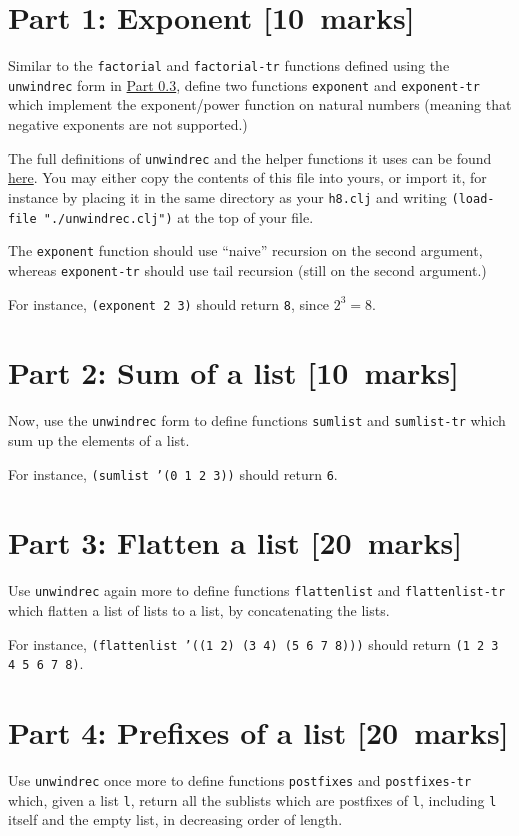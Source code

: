 \documentclass[11pt]{article}
\begin{document}
\section*{Part 1: Exponent              [10 marks]}
\label{sec:org66a7fe8}
Similar to the \texttt{factorial} and \texttt{factorial-tr} functions defined
using the \texttt{unwindrec} form in \hyperref[sec:org930ca81]{Part 0.3},
define two functions \texttt{exponent} and \texttt{exponent-tr} which
implement the exponent/power function on natural numbers
(meaning that negative exponents are not supported.)

The full definitions of \texttt{unwindrec} and the helper functions it uses
can be found \href{./src/h8/unwindrec.clj}{here}. You may either copy the contents of this file into yours,
or import it, for instance by placing it in the same directory
as your \texttt{h8.clj} and writing \texttt{(load-file "./unwindrec.clj")} at the top of your file.

The \texttt{exponent} function should use “naive” recursion on the second argument,
whereas \texttt{exponent-tr} should use tail recursion (still on the second argument.)

For instance, \texttt{(exponent 2 3)} should return \texttt{8}, since \(2^{3} = 8\).

\section*{Part 2: Sum of a list         [10 marks]}
\label{sec:org6e97a4e}
Now, use the \texttt{unwindrec} form to define functions \texttt{sumlist} and \texttt{sumlist-tr} which
sum up the elements of a list.

For instance, \texttt{(sumlist '(0 1 2 3))} should return \texttt{6}.

\section*{Part 3: Flatten a list        [20 marks]}
\label{sec:orgb53677a}
Use \texttt{unwindrec} again more to define functions \texttt{flattenlist} and \texttt{flattenlist-tr} which
flatten a list of lists to a list, by concatenating the lists.

For instance, \texttt{(flattenlist '((1 2) (3 4) (5 6 7 8)))} should return \texttt{(1 2 3 4 5 6 7 8)}.

\section*{Part 4: Prefixes of a list    [20 marks]}
\label{sec:orgb299648}
Use \texttt{unwindrec} once more to define functions \texttt{postfixes} and \texttt{postfixes-tr} which,
given a list \texttt{l}, return all the sublists which are postfixes of \texttt{l},
including \texttt{l} itself and the empty list, in decreasing order of length.
\end{document}
